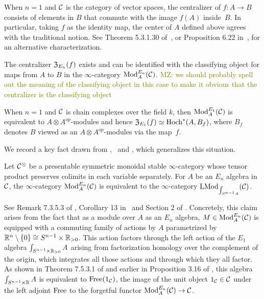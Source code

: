 \documentclass[11pt]{amsart}
\numberwithin{equation}{section}
\def\mahmoud{\textcolor{olive}{MZ: }\textcolor{olive}}
\begin{document}
When $n=1$ and $\mathcal C$ is the category of vector spaces, 
the centralizer of $f: A \to B$ consists of elements in $B$ that commute with the image $f(A)$ inside~$B$. 
In particular, taking $f$ as the identity map, 
the center of $A$ defined above agrees with the traditional notion. 
See Theorem 5.3.1.30 of~\cite{LurieHA}, or Proposition 6.22 in~\cite{GTZ3}, for an alternative characterization.

\begin{prp}
\label{T:centralizer=inthom} 
The centralizer ${\frak Z}_{E_n}(f)$ exists and can be identified with the classifying object for maps from $A$ to $B$ in the $\infty$-category ${\rm Mod}^{E_n}_A(\mathcal C)$. \mahmoud{we should probably spell out the meaning of the classifying object in this case to make it obvious that the centralizer is the classifying object}
\end{prp} 

When $n=1$ and $\mathcal C$ is chain complexes over the field $k$, then ${\rm Mod}^{E_1}_A(\mathcal C)$ is equivalent to $A\otimes A^{op}$-modules and hence ${\frak Z}_{E_1}(f) \simeq {\rm Hoch}^*(A,B_f)$,
where $B_f$ denotes $B$ viewed as an $A\otimes A^{op}$-modules via the map~$f$.

We record a key fact drawn from \cite{LurieHA},~\cite{FrancisHH}  and \cite{GG-Notes}, which generalizes this situation.

\begin{prp}
\label{P:ModentoModSn}
Let $\mathcal C^\otimes$ be a presentable symmetric monoidal stable $\infty$-category whose tensor product preserves colimits in each variable separately.
For $A$ be an $E_n$ algebra in $\mathcal C$,
the $\infty$-category ${\rm Mod}^{E_n}_A(\mathcal C)$ is equivalent to the $\infty$-category ${\rm LMod}_{\int_{S^{n-1} A}}(\mathcal C)$.
\end{prp}

See Remark 7.3.5.3 of \cite{LurieHA}, Corollary 13 in~\cite{GG-Notes} and Section 2 of \cite{FrancisHH}.
Concretely, this claim arises from the fact that as a module over $A$ as an $E_n$ algebra, 
$M \in {\rm Mod}^{E_n}_A(\mathcal C)$ is equipped with a commuting family of actions by $A$ parametrized by $\mathbb R^n \setminus \{0\}\cong S^{n-1} \times \mathbb R_{>0}$.
This action factors through the left action of the $E_1$ algebra $\int_{S^{n-1} \times \mathbb R_{>0}} A$ arising from factorization homology over the complement of the origin,
which integrates all those actions and through which they all factor. 
As shown in Theorem 7.5.3.1 of \cite{LurieHA} and earlier in Proposition 3.16 of \cite{FrancisHH}, 
this algebra $\int_{S^{n-1} \times \mathbb R} A$ is equivalent to ${\rm Free}(1_\mathcal C)$, 
the image of the unit object $1_\mathcal C \in \mathcal C$ under the left adjoint ${\rm Free}$ to the forgetful functor ${\rm Mod}^{E_n}_A(\mathcal C) \to \mathcal C$.
\end{document}
